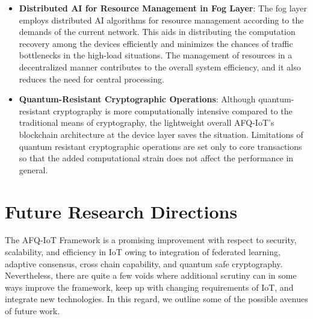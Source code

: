 \documentclass[12pt, oneside]{report}
\begin{document}
\begin{itemize}
\begin{itemize}
        \item \textbf{Distributed AI for Resource Management in Fog Layer}: The fog layer employs distributed AI algorithms for resource management according to the demands of the current network. This aids in distributing the computation recovery among the devices efficiently and minimizes the chances of traffic bottlenecks in the high-load situations. The management of resources in a decentralized manner contributes to the overall system efficiency, and it also reduces the need for central processing.

        \item \textbf{Quantum-Resistant Cryptographic Operations}: Although quantum-resistant cryptography is more computationally intensive compared to the traditional means of cryptography, the lightweight overall AFQ-IoT’s blockchain architecture at the device layer saves the situation. Limitations of quantum resistant cryptographic operations are set only to core transactions so that the added computational strain does not affect the performance in general.  

    \end{itemize}

\end{itemize}




\chapter{Future Research Directions}

The AFQ-IoT Framework is a promising improvement with respect to security, scalability, and efficiency in IoT owing to integration of federated learning, adaptive consensus, cross chain capability, and quantum safe cryptography. Nevertheless, there are quite a few voids where additional scrutiny can in some ways improve the framework, keep up with changing requirements of IoT, and integrate new technologies. In this regard, we outline some of the possible avenues of future work.
\end{document}
